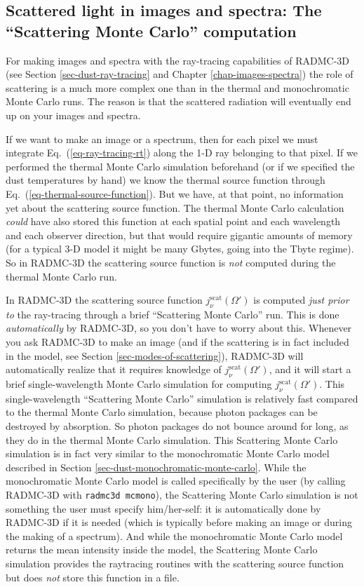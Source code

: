 \documentclass{report}
\begin{document}
\subsection{Scattered light in images and spectra: The ``Scattering Monte Carlo'' computation}
\label{sec-scat-monte-carlo}
%
For making images and spectra with the ray-tracing capabilities of RADMC-3D
(see Section \ref{sec-dust-ray-tracing} and Chapter
\ref{chap-images-spectra}) the role of scattering is a much more complex one
than in the thermal and monochromatic Monte Carlo runs. The reason is that
the scattered radiation will eventually end up on your images and spectra.

If we want to make an image or a spectrum, then for each pixel we must
integrate Eq.~(\ref{eq-ray-tracing-rt}) along the 1-D ray belonging to that
pixel. If we performed the thermal Monte Carlo simulation beforehand (or if
we specified the dust temperatures by hand) we know the thermal source
function through Eq.~(\ref{eq-thermal-source-function}). But we have, at
that point, no information yet about the scattering source function. The
thermal Monte Carlo calculation {\em could} have also stored this function
at each spatial point and each wavelength and each observer direction, but
that would require gigantic amounts of memory (for a typical 3-D model it
might be many Gbytes, going into the Tbyte regime). So in RADMC-3D the
scattering source function is {\em not} computed during the thermal
Monte Carlo run. 

In RADMC-3D the scattering source function $j_\nu^{\mathrm{scat}}(\Omega')$
is computed {\em just prior to} the ray-tracing through a brief ``Scattering
Monte Carlo'' run. This is done {\em automatically} by RADMC-3D, so you
don't have to worry about this. Whenever you ask RADMC-3D to make an image
(and if the scattering is in fact included in the model, see Section
\ref{sec-modes-of-scattering}), RADMC-3D will automatically realize that it
requires knowledge of $j_\nu^{\mathrm{scat}}(\Omega')$, and it will start a
brief single-wavelength Monte Carlo simulation for computing
$j_\nu^{\mathrm{scat}}(\Omega')$. This single-wavelength ``Scattering Monte
Carlo'' simulation is relatively fast compared to the thermal Monte Carlo
simulation, because photon packages can be destroyed by absorption. So
photon packages do not bounce around for long, as they do in the thermal
Monte Carlo simulation.  This Scattering Monte Carlo simulation is in fact
very similar to the monochromatic Monte Carlo model described in Section
\ref{sec-dust-monochromatic-monte-carlo}. While the monochromatic Monte
Carlo model is called specifically by the user (by calling RADMC-3D with
{\small\tt radmc3d mcmono}), the Scattering Monte Carlo simulation is not
something the user must specify him/her-self: it is automatically done by
RADMC-3D if it is needed (which is typically before making an image or
during the making of a spectrum). And while the monochromatic Monte Carlo
model returns the mean intensity inside the model, the Scattering Monte Carlo
simulation provides the raytracing routines with the scattering source
function but does {\em not} store this function in a file.
\end{document}

